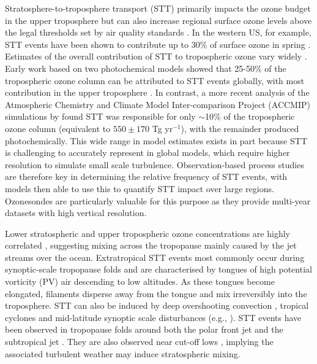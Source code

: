 Stratosphere-to-troposphere transport (STT) primarily impacts the ozone budget in the upper troposphere but can also increase regional surface ozone levels above the legal thresholds set by air quality standards \citep{Danielson1968, Lefohn2011, Langford2012, Zhang2014}.
In the western US, for example, STT events have been shown to contribute up to 30\% of surface ozone in spring \citep{Lin2012}.
Estimates of the overall contribution of STT to tropospheric ozone vary widely \citep[e.g.,][]{Galani2003, Stohl2003, Stevenson2006, Lefohn2011}.
Early work based on two photochemical models showed that 25-50\% of the tropospheric ozone column can be attributed to STT events globally, with most contribution in the upper troposphere \citep{Stohl2003}.
In contrast, a more recent analysis of the Atmospheric Chemistry and Climate Model Inter-comparison Project (ACCMIP) simulations by \citet{Stevenson2006} found STT was responsible for only $\sim$10\% of the tropospheric ozone column (equivalent to $550\pm170$ Tg yr$^{-1}$), with the remainder produced photochemically.
This wide range in model estimates exists in part because STT is challenging to accurately represent in global models, which require higher resolution to simulate small scale turbulence.
Observation-based process studies are therefore key in determining the relative frequency of STT events, with models then able to use this to quantify STT impact over large regions.
Ozonesondes are particularly valuable for this purpose as they provide multi-year datasets with high vertical resolution.

Lower stratospheric and upper tropospheric ozone concentrations are highly correlated \citep{Terao2008}, suggesting mixing across the tropopause mainly caused by the jet streams over the ocean.
Extratropical STT events most commonly occur during synoptic-scale tropopause folds \citep{Sprenger2003, Tang2012, Frey2015} and are characterised by tongues of high potential vorticity (PV) air descending to low altitudes.
As these tongues become elongated, filaments disperse away from the tongue and mix irreversibly into the troposphere.
STT can also be induced by deep overshooting convection \citep{Frey2015}, tropical cyclones \citep{Das2016} and mid-latitude synoptic scale disturbances (e.g., \citet{Stohl2003, Mihalikova2012}). 
STT events have been observed in tropopause folds around both the polar front jet \citep{Vaughan1994, Beekmann1997} and the subtropical jet \citep{Baray2000}.
They are also observed near cut-off lows \citep{Price1993, Wirth1995}, implying the associated turbulent weather may induce stratospheric mixing.

